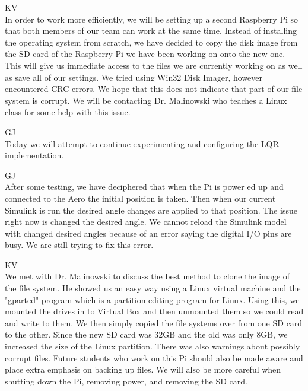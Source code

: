 \documentclass[fontsize=11pt, %
                             paper=letter, %
                             openany, %
                             captions=tableheading,
                             index=totoc,
                             hyperref]{labbook}
\begin{document}
\begin{addmargin}[0cm]{0cm}
KV\\
In order to work more efficiently, we will be setting up a second Raspberry Pi so that both members of our team can work at the same time.  Instead of installing the operating system from scratch, we have decided to copy the disk image from the SD card of the Raspberry Pi we have been working on onto the new one.  This will give us immediate access to the files we are currently working on as well as save all of our settings.  We tried using Win32 Disk Imager, however encountered CRC errors.  We hope that this does not indicate that part of our file system is corrupt.  We will be contacting Dr. Malinowski who teaches a Linux class for some help with this issue.

GJ\\
Today we will attempt to continue experimenting and configuring the LQR implementation.

GJ\\
After some testing, we have deciphered that when the Pi is power
ed up and connected to the Aero the initial position is taken.  Then when our current Simulink is run the desired angle changes are applied to that position.  The issue right now is changed the desired angle.  We cannot reload the Simulink model with changed desired angles because of an error saying the digital I/O pins are busy.  We are still trying to fix this error.


KV\\
We met with Dr. Malinowski to discuss the best method to clone the image of the file system.  He showed us an easy way using a Linux virtual machine and the "gparted" program which is a partition editing program for Linux.  Using this, we mounted the drives in to Virtual Box and then unmounted them so we could read and write to them.  We then simply copied the file systems over from one SD card to the other.  Since the new SD card was 32GB and the old was only 8GB, we increased the size of the Linux partition.  There was also warnings about possibly corrupt files.  Future students who work on this Pi should also be made aware and place extra emphasis on backing up files.  We will also be more careful when shutting down the Pi, removing power, and removing the SD card.


\end{addmargin}
\end{document}

